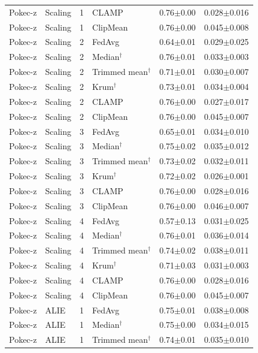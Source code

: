 \begin{longtable}{llclcc}
Pokec-z & Scaling & 1 & CLAMP & 0.76$\pm$0.00 & 0.028$\pm$0.016 \\
Pokec-z & Scaling & 1 & ClipMean & 0.76$\pm$0.00 & 0.045$\pm$0.008 \\
Pokec-z & Scaling & 2 & FedAvg & 0.64$\pm$0.01 & 0.029$\pm$0.025 \\
Pokec-z & Scaling & 2 & Median$^\dagger$ & 0.76$\pm$0.01 & 0.033$\pm$0.003 \\
Pokec-z & Scaling & 2 & Trimmed mean$^\dagger$ & 0.71$\pm$0.01 & 0.030$\pm$0.007 \\
Pokec-z & Scaling & 2 & Krum$^\dagger$ & 0.73$\pm$0.01 & 0.034$\pm$0.004 \\
Pokec-z & Scaling & 2 & CLAMP & 0.76$\pm$0.00 & 0.027$\pm$0.017 \\
Pokec-z & Scaling & 2 & ClipMean & 0.76$\pm$0.00 & 0.045$\pm$0.007 \\
Pokec-z & Scaling & 3 & FedAvg & 0.65$\pm$0.01 & 0.034$\pm$0.010 \\
Pokec-z & Scaling & 3 & Median$^\dagger$ & 0.75$\pm$0.02 & 0.035$\pm$0.012 \\
Pokec-z & Scaling & 3 & Trimmed mean$^\dagger$ & 0.73$\pm$0.02 & 0.032$\pm$0.011 \\
Pokec-z & Scaling & 3 & Krum$^\dagger$ & 0.72$\pm$0.02 & 0.026$\pm$0.001 \\
Pokec-z & Scaling & 3 & CLAMP & 0.76$\pm$0.00 & 0.028$\pm$0.016 \\
Pokec-z & Scaling & 3 & ClipMean & 0.76$\pm$0.00 & 0.046$\pm$0.007 \\
Pokec-z & Scaling & 4 & FedAvg & 0.57$\pm$0.13 & 0.031$\pm$0.025 \\
Pokec-z & Scaling & 4 & Median$^\dagger$ & 0.76$\pm$0.01 & 0.036$\pm$0.014 \\
Pokec-z & Scaling & 4 & Trimmed mean$^\dagger$ & 0.74$\pm$0.02 & 0.038$\pm$0.011 \\
Pokec-z & Scaling & 4 & Krum$^\dagger$ & 0.71$\pm$0.03 & 0.031$\pm$0.003 \\
Pokec-z & Scaling & 4 & CLAMP & 0.76$\pm$0.00 & 0.028$\pm$0.016 \\
Pokec-z & Scaling & 4 & ClipMean & 0.76$\pm$0.00 & 0.045$\pm$0.007 \\
Pokec-z & ALIE & 1 & FedAvg & 0.75$\pm$0.01 & 0.038$\pm$0.008 \\
Pokec-z & ALIE & 1 & Median$^\dagger$ & 0.75$\pm$0.00 & 0.034$\pm$0.015 \\
Pokec-z & ALIE & 1 & Trimmed mean$^\dagger$ & 0.74$\pm$0.01 & 0.035$\pm$0.010 \\

\end{longtable}
